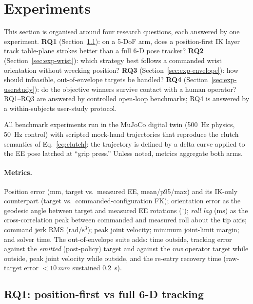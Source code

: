 \section{Experiments}
\label{sec:experiments}


This section is organised around four research questions, each answered by
one experiment. \textbf{RQ1} (Section~\ref{sec:exp-tracking}): on a 5-DoF
arm, does a position-first IK layer track table-plane strokes better than a
full 6-D pose tracker? \textbf{RQ2} (Section~\ref{sec:exp-wrist}): which
strategy best follows a commanded wrist orientation without wrecking
position? \textbf{RQ3} (Section~\ref{sec:exp-envelope}): how should
infeasible, out-of-envelope targets be handled? \textbf{RQ4}
(Section~\ref{sec:exp-userstudy}): do the objective winners survive contact
with a human operator? RQ1--RQ3 are answered by controlled open-loop
benchmarks; RQ4 is answered by a within-subjects user-study protocol.

All benchmark experiments run in the MuJoCo digital twin (\SI{500}{Hz}
physics, \SI{50}{Hz} control) with scripted mock-hand trajectories that
reproduce the clutch semantics of Eq.~\eqref{eq:clutch}: the trajectory is
defined by a delta curve applied to the EE pose latched at ``grip press.''
Unless noted, metrics aggregate both arms.

\paragraph{Metrics.}
Position error (\(\mathrm{mm}\), target vs.\ measured EE, mean/p95/max) and
its IK-only counterpart (target vs.\ commanded-configuration FK);
orientation error as the geodesic angle between target and measured EE
rotations (\(^\circ\)); \emph{roll lag} (\(\mathrm{ms}\)) as the
cross-correlation peak between commanded and measured roll about the tip
axis; command jerk RMS (\(\mathrm{rad/s^3}\)); peak joint velocity; minimum
joint-limit margin; and solver time. The out-of-envelope suite adds:
time outside, tracking error against the \emph{emitted} (post-policy)
target and against the \emph{raw} operator target while outside, peak joint
velocity while outside, and the re-entry recovery time (raw-target error
\(<\SI{10}{mm}\) sustained \SI{0.2}{s}).

\subsection{RQ1: position-first vs full 6-D tracking}
\label{sec:exp-tracking}

